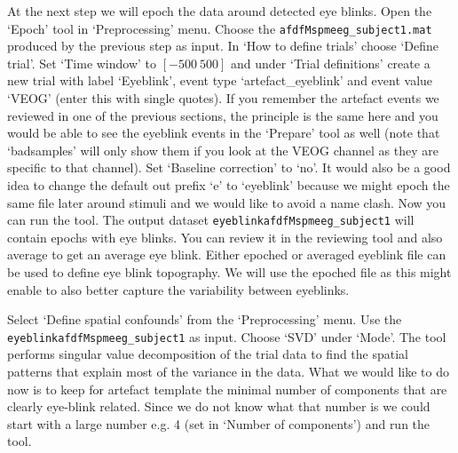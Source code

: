 At the next step we will epoch the data around detected eye blinks. Open the `Epoch' tool in `Preprocessing' menu. Choose the \texttt{afdfMspmeeg\_subject1.mat} produced by the previous step as input. In `How to define trials' choose `Define trial'. Set `Time window' to $[-500\ 500]$ and under `Trial definitions' create a new trial with label `Eyeblink', event type `artefact\_eyeblink' and event value `VEOG' (enter this with single quotes). If you remember the artefact events we reviewed in one of the previous sections, the principle is the same here and you would be able to see the eyeblink events in the `Prepare' tool as well (note that `badsamples' will only show them if you look at the VEOG channel as they are specific to that channel). Set `Baseline correction' to `no'. It would also be a good idea to change the default out prefix `e' to `eyeblink' because we might epoch the same file later around stimuli and we would like to avoid a name clash. Now you can run the tool. The output dataset \texttt{eyeblinkafdfMspmeeg\_subject1} will contain epochs with eye blinks. You can review it in the reviewing tool and also average to get an average eye blink. Either epoched or averaged eyeblink file can be used to define eye blink topography. We will use the epoched file as this might enable to also better capture the variability between eyeblinks.

Select `Define spatial confounds' from the `Preprocessing' menu. Use the \texttt{eyeblinkafdfMspmeeg\_subject1} as input. Choose `SVD' under `Mode'. The tool performs singular value decomposition of the trial data to find the spatial patterns that explain most of the variance in the data. What we would like to do now is to keep for artefact template the minimal number of components that are clearly eye-blink related. Since we do not know what that number is we could start with a large number e.g. 4 (set in `Number of components') and run the tool. 

